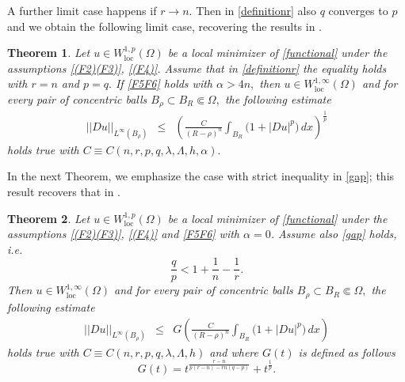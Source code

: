 \documentclass[12pt]{amsart}
\newtheorem{theorem}{Theorem}[section]
\theoremstyle{definition}
\numberwithin{equation}{section}
\def\tcv{\textcolor{violet}}
\numberwithin{equation}{section}
\begin{document}
{A further limit case happens if $r \rightarrow n$. Then in \eqref{definitionr} also $q$ converges to $p$ and we obtain the following limit case, recovering the results in \cite{CGHPdN20}.

\begin{theorem}
\label{mainresult2}
    Let $u\in W^{1,p}_{\mathrm{loc}}(\Omega)$ be a local minimizer of \eqref{functional} under the assumptions \eqref{(F2)(F3)}, \eqref{(F4)}. %
  Assume that in \eqref{definitionr} the equality holds with $r = n$ and $p = q.$ If \eqref{F5F6} holds with $\alpha > 4n,$ then $u\in W^{1,\infty}_{\mathrm{loc}}(\Omega)$ and for every pair of concentric balls $B_\rho\subset B_R\Subset\Omega,$ the following estimate
 \begin{eqnarray}
     \label{mainaptotalebis}
||Du||_{L^{\infty}(B_{\rho})} &\le& \left(\!\frac{C}{( R - \rho )^{n}}  \int_{B_{R}} \!\!\Big(1 + |Du|^p \Big)
\, dx\right)^{\frac{1}{p}}
\end{eqnarray}
holds true  with $C \equiv C(n, r, p, q, \lambda, \Lambda, h, \alpha).$
\end{theorem}
In the next Theorem, we emphasize the case with strict inequality in \eqref{gap}; this result  recovers that in \cite{EMM16}.

\begin{theorem}
\label{mainresult3}
  Let $u\in W^{1,p}_{\mathrm{loc}}(\Omega)$ be a local minimizer of \eqref{functional} under the assumptions \eqref{(F2)(F3)}, \eqref{(F4)} and \eqref{F5F6} with $\alpha = 0$.
  Assume also \eqref{gap} holds, i.e. %
   \begin{equation}\label{definitionrter}
    \frac{q}{p} < 1+\frac{1}{n}-\frac{1}{r}.  
    \end{equation} 
 Then $u\in W^{1,\infty}_{\mathrm{loc}}(\Omega)$ and for every pair of concentric balls $B_\rho\subset B_R\Subset\Omega,$ the following estimate
 \begin{eqnarray}
     \label{mainaptotaleter}
||Du||_{L^{\infty}(B_{\rho})} &\le& G\left(\!\frac{C}{( R - \rho )^{n}}  \int_{B_{R}} \!\!\Big(1 + |Du|^p \Big)
\, dx\right)
\end{eqnarray}
holds true  with $C \equiv C(n, r, p, q, \lambda, \Lambda, h)$ and where $G(t)$ is defined as follows
\begin{equation}
\label{DefinizioneG3}
G(t)= t^\frac{r-n}{p(r-n)-rn(q-p)} + t^{\frac1p}.
\end{equation}



\end{theorem}}
\end{document}
